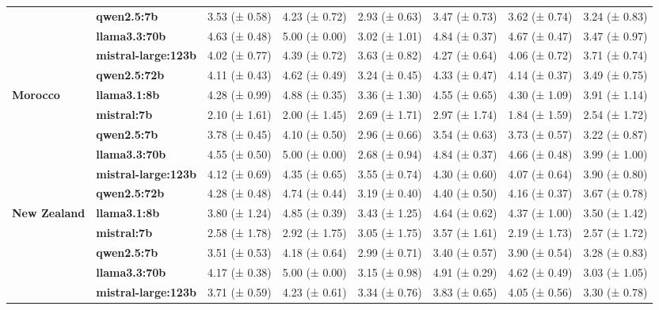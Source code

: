 \begin{longtable}{llllllll}
\textbf{} & \textbf{qwen2.5:7b} & 3.53 (± 0.58) & 4.23 (± 0.72) & 2.93 (± 0.63) & 3.47 (± 0.73) & 3.62 (± 0.74) & 3.24 (± 0.83) \\
\textbf{} & \textbf{llama3.3:70b} & 4.63 (± 0.48) & 5.00 (± 0.00) & 3.02 (± 1.01) & 4.84 (± 0.37) & 4.67 (± 0.47) & 3.47 (± 0.97) \\
\textbf{} & \textbf{mistral-large:123b} & 4.02 (± 0.77) & 4.39 (± 0.72) & 3.63 (± 0.82) & 4.27 (± 0.64) & 4.06 (± 0.72) & 3.71 (± 0.74) \\
\textbf{} & \textbf{qwen2.5:72b} & 4.11 (± 0.43) & 4.62 (± 0.49) & 3.24 (± 0.45) & 4.33 (± 0.47) & 4.14 (± 0.37) & 3.49 (± 0.75) \\
\cline{1-8}
\multirow[t]{6}{*}{\textbf{Morocco}} & \textbf{llama3.1:8b} & 4.28 (± 0.99) & 4.88 (± 0.35) & 3.36 (± 1.30) & 4.55 (± 0.65) & 4.30 (± 1.09) & 3.91 (± 1.14) \\
\textbf{} & \textbf{mistral:7b} & 2.10 (± 1.61) & 2.00 (± 1.45) & 2.69 (± 1.71) & 2.97 (± 1.74) & 1.84 (± 1.59) & 2.54 (± 1.72) \\
\textbf{} & \textbf{qwen2.5:7b} & 3.78 (± 0.45) & 4.10 (± 0.50) & 2.96 (± 0.66) & 3.54 (± 0.63) & 3.73 (± 0.57) & 3.22 (± 0.87) \\
\textbf{} & \textbf{llama3.3:70b} & 4.55 (± 0.50) & 5.00 (± 0.00) & 2.68 (± 0.94) & 4.84 (± 0.37) & 4.66 (± 0.48) & 3.99 (± 1.00) \\
\textbf{} & \textbf{mistral-large:123b} & 4.12 (± 0.69) & 4.35 (± 0.65) & 3.55 (± 0.74) & 4.30 (± 0.60) & 4.07 (± 0.64) & 3.90 (± 0.80) \\
\textbf{} & \textbf{qwen2.5:72b} & 4.28 (± 0.48) & 4.74 (± 0.44) & 3.19 (± 0.40) & 4.40 (± 0.50) & 4.16 (± 0.37) & 3.67 (± 0.78) \\
\cline{1-8}
\multirow[t]{6}{*}{\textbf{New Zealand}} & \textbf{llama3.1:8b} & 3.80 (± 1.24) & 4.85 (± 0.39) & 3.43 (± 1.25) & 4.64 (± 0.62) & 4.37 (± 1.00) & 3.50 (± 1.42) \\
\textbf{} & \textbf{mistral:7b} & 2.58 (± 1.78) & 2.92 (± 1.75) & 3.05 (± 1.75) & 3.57 (± 1.61) & 2.19 (± 1.73) & 2.57 (± 1.72) \\
\textbf{} & \textbf{qwen2.5:7b} & 3.51 (± 0.53) & 4.18 (± 0.64) & 2.99 (± 0.71) & 3.40 (± 0.57) & 3.90 (± 0.54) & 3.28 (± 0.83) \\
\textbf{} & \textbf{llama3.3:70b} & 4.17 (± 0.38) & 5.00 (± 0.00) & 3.15 (± 0.98) & 4.91 (± 0.29) & 4.62 (± 0.49) & 3.03 (± 1.05) \\
\textbf{} & \textbf{mistral-large:123b} & 3.71 (± 0.59) & 4.23 (± 0.61) & 3.34 (± 0.76) & 3.83 (± 0.65) & 4.05 (± 0.56) & 3.30 (± 0.78) \\

\end{longtable}
